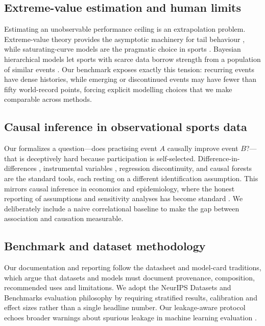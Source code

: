 \subsection{Extreme-value estimation and human limits}
\label{sec:related-evt}

Estimating an unobservable performance ceiling is an extrapolation problem.
Extreme-value theory provides the asymptotic machinery for tail behaviour
\citep{evt_coles, pickands}, while saturating-curve models are the pragmatic
choice in sports \citep{nevill_running, tatem_sprint}. Bayesian hierarchical models let
sports with scarce data borrow strength from a population of similar events
\citep{bayesian_hierarchical}. Our  benchmark exposes exactly this
tension: recurring events have dense histories, while emerging or discontinued
events may have fewer than fifty world-record points, forcing explicit
modelling choices that we make comparable across methods.

\subsection{Causal inference in observational sports data}
\label{sec:related-causal}

Our  formalizes a question---does practising event $A$ causally improve
event $B$?---that is deceptively hard because participation is self-selected.
Difference-in-differences \citep{did}, instrumental variables \citep{iv},
regression discontinuity, and causal forests \citep{causal_forest} are the
standard tools, each resting on a different identification assumption. This
mirrors causal inference in economics and epidemiology, where the honest
reporting of assumptions and sensitivity analyses has become standard
\citep{sensitivity_analysis}. We deliberately include a naive correlational
baseline to make the gap between association and causation measurable.

\subsection{Benchmark and dataset methodology}
\label{sec:related-methodology}

Our documentation and reporting follow the datasheet \citep{datasheets} and
model-card \citep{model_cards} traditions, which argue that datasets and
models must document provenance, composition, recommended uses and limitations.
We adopt the NeurIPS Datasets and Benchmarks evaluation philosophy
\citep{neurips_dnb} by requiring stratified results, calibration and effect
sizes rather than a single headline number. Our leakage-aware protocol echoes
broader warnings about spurious leakage in machine learning evaluation
\citep{leakage_kaufman}.

